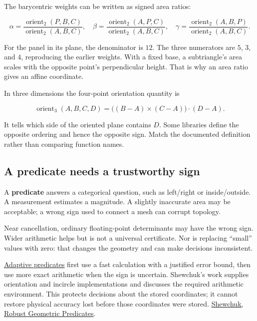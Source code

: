 The barycentric weights can be written as signed area ratios:

\[
\alpha=\frac{\operatorname{orient}_2(P,B,C)}{\operatorname{orient}_2(A,B,C)},\quad
\beta=\frac{\operatorname{orient}_2(A,P,C)}{\operatorname{orient}_2(A,B,C)},\quad
\gamma=\frac{\operatorname{orient}_2(A,B,P)}{\operatorname{orient}_2(A,B,C)}.
\]

For the panel in its plane, the denominator is \(12\). The three numerators are \(5\), \(3\), and \(4\), reproducing the earlier weights. With a fixed base, a subtriangle's area scales with the opposite point's perpendicular height. That is why an area ratio gives an affine coordinate.

In three dimensions the four-point orientation quantity is

\[
\operatorname{orient}_3(A,B,C,D)
=\big((B-A)\times(C-A)\big)\cdot(D-A).
\]

It tells which side of the oriented plane contains \(D\). Some libraries define the opposite ordering and hence the opposite sign. Match the documented definition rather than comparing function names.

\subsection{A predicate needs a trustworthy sign}\label{01-foundations-i-ch018-a-predicate-needs-a-trustworthy-sign}

\hypertarget{01-foundations-i-ch018-a-predicate-needs-a-trustworthy-sign}{}

A \textbf{predicate} answers a categorical question, such as left/right or inside/outside. A measurement estimates a magnitude. A slightly inaccurate area may be acceptable; a wrong sign used to connect a mesh can corrupt topology.

Near cancellation, ordinary floating-point determinants may have the wrong sign. Wider arithmetic helps but is not a universal certificate. Nor is replacing ``small'' values with zero: that changes the geometry and can make decisions inconsistent.

\hyperref[01-foundations-i-ch018-the-sensor-needs-coordinates-inside-the-triangle]{Adaptive predicates} first use a fast calculation with a justified error bound, then use more exact arithmetic when the sign is uncertain. Shewchuk's work supplies orientation and incircle implementations and discusses the required arithmetic environment. This protects decisions about the stored coordinates; it cannot restore physical accuracy lost before those coordinates were stored. \href{https://www.cs.cmu.edu/~quake/robust.html}{Shewchuk, Robust Geometric Predicates}.

